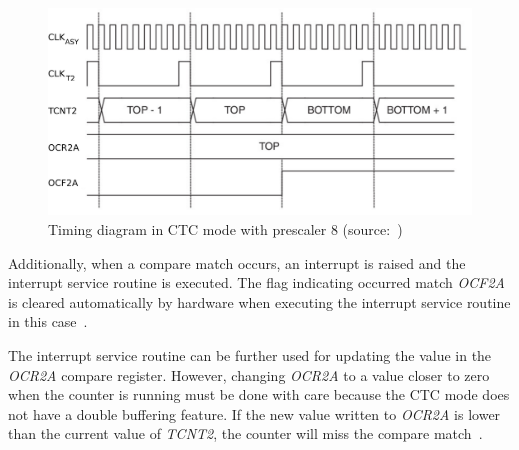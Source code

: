 \begin{figure}
  \centering
  \includegraphics[width=12cm,keepaspectratio]{fig/timing-diagram.pdf}
  \caption{Timing diagram in CTC mode with prescaler 8 (source:~\cite{avr-datasheet})}
  \label{fig:design-timing-diagram}
\end{figure}

Additionally, when a compare match occurs,
an interrupt is raised and the interrupt service routine is executed.
The flag indicating occurred match {\it{OCF2A}} is
cleared automatically by hardware when executing
the interrupt service routine in this case~\cite{avr-datasheet}.

The interrupt service routine can be further used for updating the value in the {\it{OCR2A}} compare register.
However, changing {\it{OCR2A}} to a value closer to zero when the counter is running
must be done with care because the CTC mode does not have a double buffering feature.
If the new value written to {\it{OCR2A}} is lower than the current
value of {\it{TCNT2}}, the counter will miss the compare match~\cite{avr-datasheet}.
